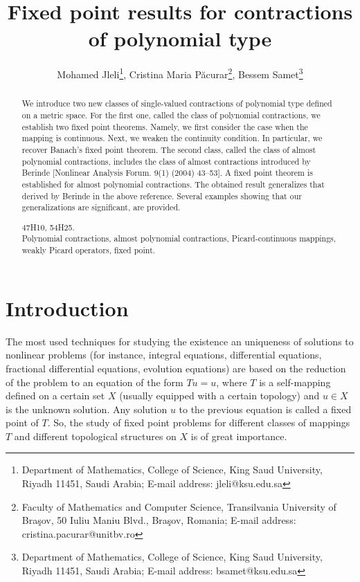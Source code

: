 \documentclass[letterpaper,12pt]{article}
\title{Fixed point results for contractions of polynomial type}
\author{Mohamed Jleli\footnote{Department of Mathematics, College of Science, King Saud University, Riyadh 11451, Saudi Arabia; E-mail address: jleli@ksu.edu.sa}, Cristina Maria P\u{a}curar\footnote{Faculty of Mathematics and Computer Science, Transilvania University of Bra\c{s}ov, 50 Iuliu Maniu Blvd., Bra\c{s}ov, Romania; E-mail address: cristina.pacurar@unitbv.ro},  Bessem Samet\footnote{Department of Mathematics, College of Science, King Saud University, Riyadh 11451, Saudi Arabia; E-mail address: bsamet@ksu.edu.sa}}
\date{}
\numberwithin{equation}{section}
\theoremstyle{definition}
\theoremstyle{remark}
\begin{document}
\setlength{\headheight}{13.59999pt}
\addtolength{\topmargin}{-1.59999pt}
\maketitle


\begin{abstract}
We introduce two new classes of single-valued  contractions of polynomial type defined on a metric space. For the first one, called the class of polynomial contractions, we establish two fixed point theorems. Namely, we first consider the case when the  mapping is continuous. Next, we weaken the continuity condition. In particular, we recover Banach's fixed point theorem. The second class, called the class of almost polynomial contractions, includes the class of almost contractions introduced by Berinde [Nonlinear Analysis Forum. 9(1) (2004) 43--53]. A fixed point theorem is established for almost polynomial contractions. The obtained result generalizes that derived by Berinde in the above reference. Several examples showing that our generalizations are significant, are provided.  

\vspace{0.1cm}

 47H10, 54H25.\\
 Polynomial contractions, almost polynomial contractions, Picard-continuous mappings, weakly Picard operators,  fixed point.  
\end{abstract}




\section{Introduction}\label{sec1}


The most used techniques for studying the existence an uniqueness of solutions to nonlinear problems (for instance, integral equations, differential equations, fractional differential equations, evolution equations)  are based on the reduction of the problem to an equation of the form  $Tu=u$, where $T$ is a self-mapping defined on a certain set $X$ (usually equipped with a certain topology) and $u\in X$ is the unknown solution. Any solution $u$ to the previous equation is called a fixed point of $T$. So, the study of fixed point problems for different classes of mappings $T$ and different topological structures on $X$ is of great importance.
\end{document}
